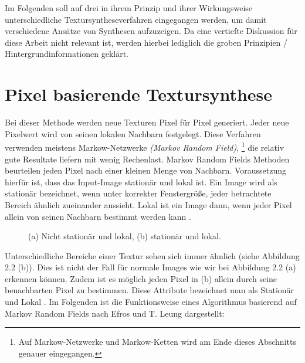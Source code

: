 \documentclass[12pt, a4paper,twoside,openany]{report} %
\begin{document}
Im Folgenden soll auf drei in ihrem Prinzip und ihrer Wirkungsweise unterschiedliche Textursyntheseverfahren eingegangen werden,
um damit verschiedene Ansätze von Synthesen aufzuzeigen.
Da eine vertiefte Diskussion für diese Arbeit nicht relevant ist, werden hierbei lediglich die groben Prinzipien / Hintergrundinformationen geklärt.

\section{Pixel basierende Textursynthese}

Bei dieser Methode werden neue Texturen Pixel für Pixel generiert.
Jeder neue Pixelwert wird von seinen lokalen Nachbarn festgelegt.
Diese Verfahren verwenden meistens Markow-Netzwerke \textit{(Markov Random Field)},
\footnote[1]{Auf Markow-Netzwerke und Markow-Ketten wird am Ende dieses Abschnitts genauer eingegangen.}
die relativ gute Resultate liefern mit wenig Rechenlast.
Markov Random Fields Methoden beurteilen jeden Pixel nach einer kleinen Menge von Nachbarn.
Voraussetzung hierfür ist, dass das Input-Image stationär und lokal ist.
Ein Image wird als stationär bezeichnet, wenn unter korrekter Fenstergröße,
jeder betrachtete Bereich ähnlich zueinander aussieht.
Lokal ist ein Image dann, wenn jeder Pixel allein von seinen Nachbarn bestimmt werden kann \cite{GomathiShah2009}.

\begin{figure}[H]
    \centering
    \qquad
    \caption{(a) Nicht stationär und lokal, (b) stationär und lokal.}%
\end{figure}

Unterschiedliche Bereiche einer Textur sehen sich immer ähnlich {(siehe Abbildung 2.2 (b))}.
Dies ist nicht der Fall für normale Images wie wir bei Abbildung 2.2 {(a)} erkennen können.
Zudem ist es möglich jeden Pixel in {(b)} allein durch seine benachbarten Pixel zu bestimmen.
Diese Attribute bezeichnet man als Stationär und Lokal \cite{GomathiShah2009}.
Im Folgenden ist die Funktionsweise eines Algorithmus basierend auf Markov Random Fields nach Efros und T. Leung dargestellt: \cite{Efros99}
\end{document}
